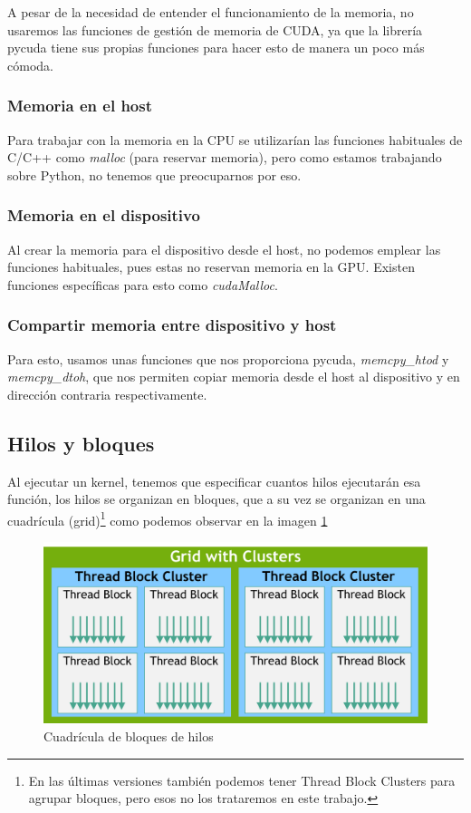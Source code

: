 A pesar de la necesidad de entender el funcionamiento de la memoria, no usaremos las funciones de  gestión de memoria de \ac{CUDA}, ya que la librería pycuda tiene sus propias funciones para hacer esto de manera un poco más cómoda.
\subsubsection{Memoria en el host}
Para trabajar con la memoria en la \ac{CPU} se utilizarían las funciones habituales de C/C++ como \emph{malloc} (para reservar memoria), pero como estamos trabajando sobre Python, no tenemos que preocuparnos por eso.
\subsubsection{Memoria en el dispositivo}
Al crear la memoria para el dispositivo desde el host, no podemos emplear las funciones habituales, pues estas no reservan memoria en la \ac{GPU}. Existen funciones específicas para esto como \emph{cudaMalloc}.
\subsubsection{Compartir memoria entre dispositivo y host}
Para esto, usamos unas funciones que nos proporciona pycuda, \emph{memcpy\_htod} y \emph{memcpy\_dtoh}, que nos permiten copiar memoria desde el host al dispositivo y en dirección contraria respectivamente.

\subsection{Hilos y bloques}
Al ejecutar un kernel, tenemos que especificar cuantos hilos ejecutarán esa función, los hilos se organizan en bloques, que a su vez se organizan en una cuadrícula (grid)\footnote{En las últimas versiones también podemos tener Thread Block Clusters para agrupar bloques, pero esos no los trataremos en este trabajo.} como podemos observar en la imagen \ref{fig:grid}


\begin{figure}
	\centering
	\includegraphics[width=0.7\linewidth]{Imagenes/Bitmap/grid}
	\caption{Cuadrícula de bloques de hilos}
	\label{fig:grid}
\end{figure}


